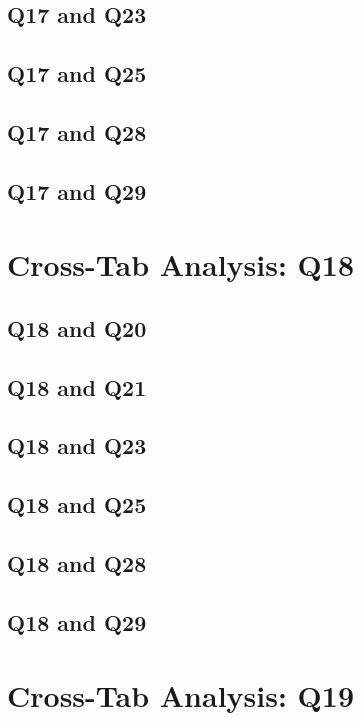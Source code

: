 \documentclass{report}
\begin{document}
\section{Q17 and Q23}\clearpage
\section{Q17 and Q25}\clearpage
\section{Q17 and Q28}\clearpage
\section{Q17 and Q29}\clearpage

\chapter{Cross-Tab Analysis: Q18}

\section{Q18 and Q20}\clearpage
\section{Q18 and Q21}\clearpage
\section{Q18 and Q23}\clearpage
\section{Q18 and Q25}\clearpage
\section{Q18 and Q28}\clearpage
\section{Q18 and Q29}\clearpage

\chapter{Cross-Tab Analysis: Q19}
\end{document}
